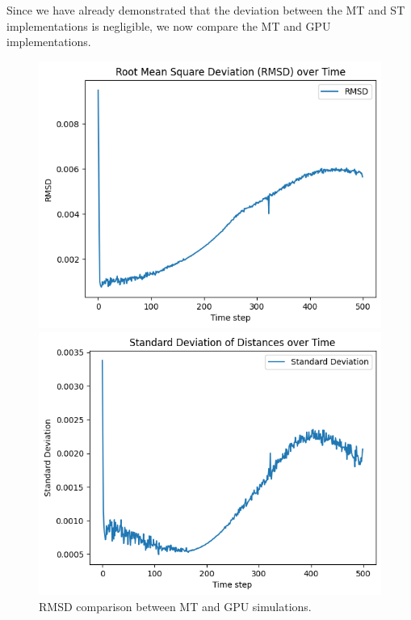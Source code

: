 \documentclass[english,11pt]{article}
\begin{document}
Since we have already demonstrated that the deviation between the MT and ST implementations is negligible, we now compare the MT and GPU implementations. 


\begin{figure}[h!]
    \centering
    \begin{minipage}{0.45\textwidth}
        \centering
        \includegraphics[width=\textwidth]{graph/RMSD_CPU-GPU.png}
        \caption{RMSD comparison between MT and GPU simulations.}
        \label{fig:rmsd_gpu}
    \end{minipage}\hfill
    \begin{minipage}{0.45\textwidth}
        \centering
        \includegraphics[width=\textwidth]{graph/std-dev_CPU_GPU.png}

\end{minipage}
\end{figure}
\end{document}
